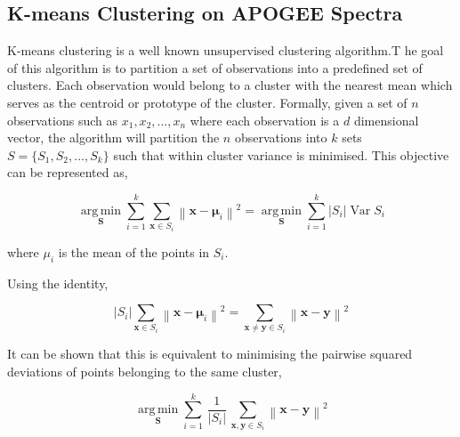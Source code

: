 \subsection{K-means Clustering on APOGEE Spectra}

K-means clustering is a well known unsupervised clustering algorithm.T he goal of this algorithm is to partition a set of observations into a predefined set of clusters. Each observation would belong to a cluster with the nearest mean which serves as the centroid or prototype of the cluster\cite{macqueen1967some}. Formally, given a set of $n$ observations such as \(x_1,x_2,...,x_n\) where each observation is a $d$ dimensional vector, the algorithm will partition the $n$ observations into $k$ sets $S=\{S_1,S_2,...,S_k\}$ such that within cluster variance is minimised. This objective can be represented as,

\begin{equation}
{\underset {\mathbf {S} }{\operatorname {arg\,min} }}\sum _{i=1}^{k}\sum _{\mathbf {x} \in S_{i}}\left\|\mathbf {x} -{\boldsymbol {\mu }}_{i}\right\|^{2}={\underset {\mathbf {S} }{\operatorname {arg\,min} }}\sum _{i=1}^{k}|S_{i}|\operatorname {Var} S_{i}
\end{equation}

where $\mu_i$ is the mean of the points in $S_i$. 

Using the identity,

\begin{equation}
    |S_{i}|\sum _{\mathbf {x} \in S_{i}}\left\|\mathbf {x} -{\boldsymbol {\mu }}_{i}\right\|^{2}=\sum _{\mathbf {x} \neq \mathbf {y} \in S_{i}}\left\|\mathbf {x} -\mathbf {y} \right\|^{2}
\end{equation}

It can be shown that this is equivalent to minimising the pairwise squared deviations of points belonging to the same cluster,

\begin{equation}
{\underset {\mathbf {S} }{\operatorname {arg\,min} }}\sum _{i=1}^{k}\,{\frac {1}{|S_{i}|}}\,\sum _{\mathbf {x} ,\mathbf {y} \in S_{i}}\left\|\mathbf {x} -\mathbf {y} \right\|^{2}
\end{equation}

